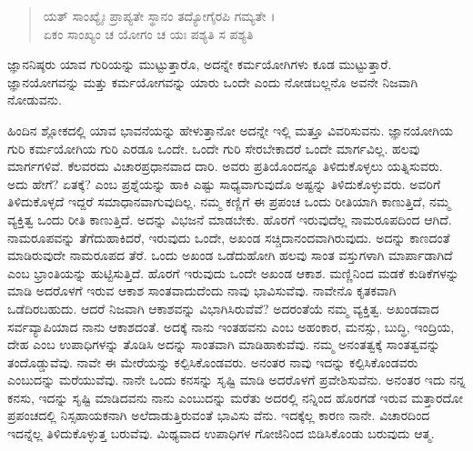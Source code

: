 \begin{verse}
ಯತ್ ಸಾಂಖ್ಯೈಃ ಪ್ರಾಪ್ಯತೇ ಸ್ಥಾನಂ ತದ್ಯೋಗೈರಪಿ ಗಮ್ಯತೇ ।\\ಏಕಂ ಸಾಂಖ್ಯಂ ಚ ಯೋಗಂ ಚ ಯಃ ಪಶ್ಯತಿ ಸ ಪಶ್ಯತಿ 
\end{verse}

{\small ಜ್ಞಾನನಿಷ್ಠರು ಯಾವ ಗುರಿಯನ್ನು ಮುಟ್ಟುತ್ತಾರೊ, ಅದನ್ನೇ ಕರ್ಮಯೋಗಿಗಳು ಕೂಡ ಮುಟ್ಟುತ್ತಾರೆ. ಜ್ಞಾನಯೋಗವನ್ನು ಮತ್ತು ಕರ್ಮಯೋಗವನ್ನು ಯಾರು ಒಂದೇ ಎಂದು ನೋಡಬಲ್ಲನೊ ಅವನೇ ನಿಜವಾಗಿ ನೋಡುವನು.}

ಹಿಂದಿನ ಶ್ಲೋಕದಲ್ಲಿ ಯಾವ ಭಾವನೆಯನ್ನು ಹೇಳುತ್ತಾನೋ ಅದನ್ನೇ ಇಲ್ಲಿ ಮತ್ತೂ ವಿವರಿಸುವನು. ಜ್ಞಾನಯೋಗಿಯ ಗುರಿ ಕರ್ಮಯೋಗಿಯ ಗುರಿ ಎರಡೂ ಒಂದೇ. ಒಂದೇ ಗುರಿ ಸೇರಬೇಕಾದರೆ ಒಂದೇ ಮಾರ್ಗವಿಲ್ಲ. ಹಲವು ಮಾರ್ಗಗಳಿವೆ. ಕೆಲವರದು ವಿಚಾರಪ್ರಧಾನವಾದ ದಾರಿ. ಅವರು ಪ್ರತಿಯೊಂದನ್ನೂ ತಿಳಿದುಕೊಳ್ಳಲು ಯತ್ನಿಸುವರು. ಅದು ಹೇಗೆ? ಏತಕ್ಕೆ? ಎಂಬ ಪ್ರಶ್ನೆಯನ್ನು ಹಾಕಿ ಎಷ್ಟು ಸಾಧ್ಯವಾಗುವುದೊ ಅಷ್ಟನ್ನು ತಿಳಿದುಕೊಳ್ಳುವರು. ಅವರಿಗೆ ತಿಳಿದುಕೊಳ್ಳದೆ ಇದ್ದರೆ ಸಮಾಧಾನವಾಗುವುದಿಲ್ಲ. ನಮ್ಮ ಕಣ್ಣಿಗೆ ಈ ಪ್ರಪಂಚ ಒಂದು ರೀತಿಯಾಗಿ ಕಾಣುತ್ತಿದೆ, ನಮ್ಮ ವ್ಯಕ್ತಿತ್ವ ಒಂದು ರೀತಿ ಕಾಣುತ್ತಿದೆ. ಅದನ್ನು ವಿಭಜನೆ ಮಾಡಬೇಕು. ಹೊರಗೆ ಇರುವುದೆಲ್ಲ ನಾಮರೂಪದಿಂದ ಆಗಿದೆ. ನಾಮರೂಪವನ್ನು ತೆಗೆದುಹಾಕಿದರೆ, ಇರುವುದು ಒಂದೇ, ಅಖಂಡ ಸಚ್ಚಿದಾನಂದವಾಗಿರುವುದು. ಅದನ್ನು ಕಾಣದಂತೆ ಮಾಡಿರುವುದೇ ನಾಮರೂಪದ ತೆರೆ. ಒಂದು ಅಖಂಡ ಒಡೆದುಹೋಗಿ ಹಲವು ಸಾಂತ ವಸ್ತುಗಳಾಗಿ ಮಾರ್ಪಾಡಾಗಿದೆ ಎಂಬ ಭ್ರಾಂತಿಯನ್ನು ಹುಟ್ಟಿಸುತ್ತಿದೆ. ಹೊರಗೆ ಇರುವುದು ಒಂದೇ ಅಖಂಡ ಆಕಾಶ. ಮಣ್ಣಿನಿಂದ ಮಡಕೆ ಕುಡಿಕೆಗಳನ್ನು ಮಾಡಿ ಅದರೊಳಗೆ ಇರುವ ಆಕಾಶ ಸಾಂತವಾದುದೆಂದು ನಾವು ಭಾವಿಸುವೆವು. ನಾವೇನೊ ಕೃತಕವಾಗಿ ಒಡೆದಿರಬಹುದು. ಆದರೆ ನಿಜವಾಗಿ ಆಕಾಶವನ್ನು ವಿಭಾಗಿಸಿರುವೆವೆ? ಅದರಂತೆಯೆ ನಮ್ಮ ವ್ಯಕ್ತಿತ್ವ. ಅಖಂಡವಾದ ಸರ್ವವ್ಯಾಪಿಯಾದ ನಾನು ಆಕಾಶದಂತೆ. ಅದಕ್ಕೆ ನಾನು ಇಂತಹವನು ಎಂಬ ಅಹಂಕಾರ, ಮನಸ್ಸು, ಬುದ್ಧಿ, ಇಂದ್ರಿಯ, ದೇಹ ಎಂಬ ಉಪಾಧಿಗಳನ್ನು ತೊಡಿಸಿ ಅದನ್ನು ಸಾಂತವಾಗಿ ಮಾಡಿಹಾಕುವೆವು. ನಮ್ಮ ಅನಂತತ್ವಕ್ಕೆ ಸಾಂತತ್ವವನ್ನು ತಂದೊಡ್ಡುವೆವು. ನಾವೇ ಈ ಮೇರೆಯನ್ನು ಕಲ್ಪಿಸಿಕೊಂಡವರು. ಅನಂತರ ನಾವು ಇದನ್ನು ಕಲ್ಪಿಸಿಕೊಂಡವರು ಎಂಬುದನ್ನು ಮರೆಯುವೆವು. ನಾನೇ ಒಂದು ಕನಸನ್ನು ಸೃಷ್ಟಿ ಮಾಡಿ ಅದರೊಳಗೆ ಪ್ರವೇಶಿಸುವೆನು. ಅನಂತರ ಇದು ನನ್ನ ಕನಸು, ಇದನ್ನು ಸೃಷ್ಟಿ ಮಾಡಿದವನು ನಾನು ಎಂಬುದನ್ನು ಮರೆತು ಅದರಲ್ಲಿ ನನ್ನಿಂದ ಹೊರಗಡೆ ಇರುವ ಮತ್ತಾರದೋ ಪ್ರಪಂಚದಲ್ಲಿ ನಿಸ್ಸಹಾಯಕನಾಗಿ ಅಲೆದಾಡುತ್ತಿರುವಂತೆ ಭಾವಿಸು ವೆನು. ಇದಕ್ಕೆಲ್ಲ ಕಾರಣ ನಾನೇ. ವಿಚಾರದಿಂದ ಇದನ್ನೆಲ್ಲ ತಿಳಿದುಕೊಳ್ಳುತ್ತ ಬರುವೆವು. ಮಿಥ್ಯವಾದ ಉಪಾಧಿಗಳ ಗೋಜಿನಿಂದ ಬಿಡಿಸಿಕೊಂಡು ಬರುವುದು ಆತ್ಮ.

